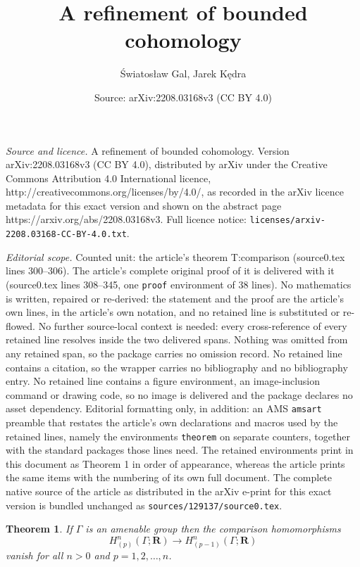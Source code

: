 \documentclass[10pt,a4paper]{amsart}
\title{A refinement of bounded cohomology}
\author{Światosław Gal, Jarek Kędra}
\date{Source: arXiv:2208.03168v3 (CC BY 4.0)}
\newtheorem{theorem}{Theorem}
\newcommand{\B}[1]{{\mathbf #1}}
\begin{document}
\maketitle

\noindent\emph{Source and licence.} A refinement of bounded cohomology. Version arXiv:2208.03168v3 (CC BY 4.0), distributed by arXiv under the Creative Commons Attribution 4.0 International licence, http://creativecommons.org/licenses/by/4.0/, as recorded in the arXiv licence metadata for this exact version and shown on the abstract page https://arxiv.org/abs/2208.03168v3. Full licence notice: \texttt{licenses/arxiv-2208.03168-CC-BY-4.0.txt}.\par\smallskip

\noindent\textit{Editorial scope.} Counted unit: the article's theorem T:comparison (source0.tex lines 300--306). The article's complete original proof of it is delivered with it (source0.tex lines 308--345, one \texttt{proof} environment of 38 lines). No mathematics is written, repaired or re-derived: the statement and the proof are the article's own lines, in the article's own notation, and no retained line is substituted or re-flowed.  No further source-local context is needed: every cross-reference of every retained line resolves inside the two delivered spans.  Nothing was omitted from any retained span, so the package carries no omission record.  No retained line contains a citation, so the wrapper carries no bibliography and no bibliography entry.  No retained line contains a figure environment, an image-inclusion command or drawing code, so no image is delivered and the package declares no asset dependency.  Editorial formatting only, in addition: an AMS \texttt{amsart} preamble that restates the article's own declarations and macros used by the retained lines, namely the environments \texttt{theorem} on separate counters, together with the standard packages those lines need.  The retained environments print in this document as Theorem 1 in order of appearance, whereas the article prints the same items with the numbering of its own full document.  The complete native source of the article as distributed in the arXiv e-print for this exact version is bundled unchanged as \texttt{sources/129137/source0.tex}.
\begin{theorem}\label{T:comparison}
If\/ $\Gamma$ is an amenable group then the comparison homomorphisms
$$
H^n_{(p)}(\Gamma;\B R)\to H^n_{(p-1)}(\Gamma;\B R)
$$
vanish for all $n>0$ and $p=1,2,\dots, n$.
\end{theorem}
\end{document}

